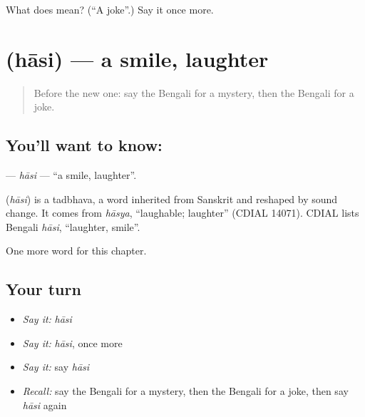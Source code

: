 \begin{tcolorbox}[breakable,colback=teal!4,colframe=teal!35!black,title={Before you move on}]
What does  mean? (\textquotedblleft{}A joke\textquotedblright{}.) Say it once more.
\end{tcolorbox}
\section[\texorpdfstring{\bn{হাসি} (hāsi)}{হাসি (hāsi)}]{ (hāsi) — a smile, laughter}

\label{lesson:BN-C253-hasi}



\begin{quote}
Before the new one: say the Bengali for a mystery, then the Bengali for a joke.
\end{quote}

\subsection*{You'll want to know: }
\textbf{} — \emph{hāsi} — \textquotedblleft{}a smile, laughter\textquotedblright{}.

\begin{cousinweb}
\textbf{} (\emph{hāsi}) is a tadbhava, a word inherited from Sanskrit and reshaped by sound change. It comes from \emph{hāsya}, \textquotedblleft{}laughable; laughter\textquotedblright{} (CDIAL 14071). CDIAL lists Bengali \emph{hāsi}, \textquotedblleft{}laughter, smile\textquotedblright{}.
\end{cousinweb}

\begin{grammarlens}[title={What you've built}]
One more word for this chapter.
\end{grammarlens}

\subsection*{Your turn}
\begin{itemize}
\raggedright
  \item \emph{Say it:} \emph{hāsi}
  \item \emph{Say it:} \emph{hāsi}, once more
  \item \emph{Say it:} say \emph{hāsi}
  \item \emph{Recall:} say the Bengali for a mystery, then the Bengali for a joke, then say \emph{hāsi} again
\end{itemize}

